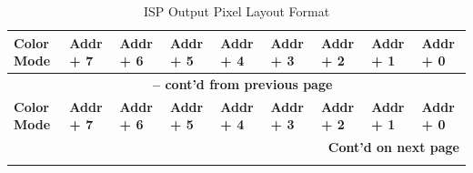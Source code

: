 \documentclass[main\_\_EN.tex]{subfiles}
\begin{document}
\scriptsize
\begin{longtable}[c]{ |p{2cm}|p{1.5cm}|p{1.5cm}|p{1.5cm}|p{1.5cm}|p{1.5cm}|p{1.5cm}|p{1.5cm}|p{1.5cm}| }
    \caption{ISP Output Pixel Layout Format}
    \label{tab:isp_output_color_space}\\\hline

    \rowcolor{lightgray}
    \textbf{Color Mode} & \textbf{Addr + 7} & \textbf{Addr + 6} & \textbf{Addr + 5} & \textbf{Addr + 4} & \textbf{Addr + 3} & \textbf{Addr + 2} & \textbf{Addr + 1} & \textbf{Addr + 0} \\\hline
    \endfirsthead


    \multicolumn{9}{c}{\bfseries \tablename\ \thetable{} -- cont'd from previous page}\\\hline
    \rowcolor{lightgray}
    \textbf{Color Mode} & \textbf{Addr + 7} & \textbf{Addr + 6} & \textbf{Addr + 5} & \textbf{Addr + 4} & \textbf{Addr + 3} & \textbf{Addr + 2} & \textbf{Addr + 1} & \textbf{Addr + 0} \\\hline
    \endhead

    \multicolumn{9}{r}{\textbf{Cont'd on next page}} \\
    \endfoot


\end{longtable}
\end{document}
